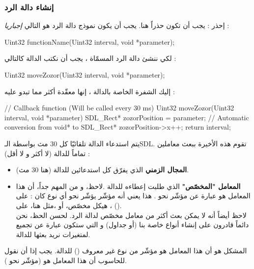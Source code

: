 \subsubsection{إنشاء دالة الرد}

إحذر : يجب أن تكون حذراً هنا. يجب أن يكون نموذج دالة الرد هو التالي 
\textit{إجباريا} :

\begin{Csource}
Uint32 functionName(Uint32 interval, void *parameter);
\end{Csource}

لكي ننشئ دالة الرد المسمّاة
،
يجب أن نكتب الدالة كالتالي :

\begin{Csource}
Uint32 moveZozor(Uint32 interval, void *parameter);
\end{Csource}

إليك الشفرة الخاصة بالدالة
،
إنها معقّدة أكثر مما تبدو عليه :

\begin{Csource}
// Callback function (Will be called every 30 ms)
Uint32 moveZozor(Uint32 interval, void *parameter)
{
	SDL_Rect* zozorPosition = parameter; // Automatic conversion from void* to SDL_Rect*
	zozorPosition->x++;
	return interval;
}
\end{Csource}

 يتم استدعاء الدالة 
تلقائيّا كل 30 مث بواسطة الـ\textenglish{SDL}.
تقوم هذه الأخيرة ببعث معاملين تماماً للدالة (لا أكثر و لا أقل) :

\begin{itemize}
	\item \textbf{المجال الزمني}
	الذي يفرّق كل استدعائين للدالة (هنا 30 مث).
	\item \textbf{المعامل "المخصّص"}
	الذي طلبت إعطاءه للدالة .لاحظ، و من المهم جداً، أن هذا المعامل هو عبارة عن مؤشّر نحو
	.
	هذا يعني أنه مؤشّر يؤشّر نحو أي نوع كان : على
	،
	هيكل مخصّص، أو ،مثل هنا، على
	 ().\\
لاحظ أيضاً أنه لا يمكن بعث أكثر من معامل مخصّص لدالة الرد. لحسن الحظ، نحن دائماً قادرون على إنشاء أنواع خاصة بنا (أو جداول) و التي ستكون عبارة عن تجميع لمتغيرات نريد بعثها للدالة.
\end{itemize}

المشكل هو أن هذا المعامل هو مؤشّر من نوع غير معروف
()
للدالة. يجب إذا أن نقول للحاسوب أن هذا المعامل هو
(مؤشّر نحو
).

